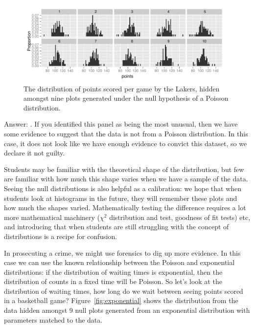 \documentclass[oneside]{article}
\begin{document}
\begin{figure}[htbp]
  \centering
    \includegraphics[width=0.9\linewidth]{poisson}
  \caption{The distribution of points scored per game by the Lakers, hidden amongst nine plots generated under the null hypothesis of a Poisson distribution.}
  \label{fig:poisson}
\end{figure}

Answer: . If you identified this panel as being the most unusual, then we have some evidence to suggest that the data is not from a Poisson distribution. In this case, it does not look like we have enough evidence to convict this dataset, so we declare it not guilty.

Students may be familiar with the theoretical shape of the distribution, but few are familiar with how much this shape varies when we have a sample of the data. Seeing the null distributions is also helpful as a calibration: we hope that when students look at histograms in the future, they will remember these plots and how much the shapes varied. Mathematically testing the difference requires a lot more mathematical machinery ($\chi^2$ distribution and test, goodness of fit tests) etc, and introducing that when students are still struggling with the concept of distributions is a recipe for confusion.

% 

In prosecuting a crime, we might use forensics to dig up more evidence. In this case we can use the known relationship between the Poisson and exponential distributions: if the distribution of waiting times is exponential, then the distribution of counts in a fixed time will be Poisson. So let's look at the distribution of waiting times, how long do we wait between seeing points scored in a basketball game? Figure~\ref{fig:exponential} shows the distribution from the data hidden amongst 9 null plots generated from an exponential distribution with parameters matched to the data.
\end{document}
